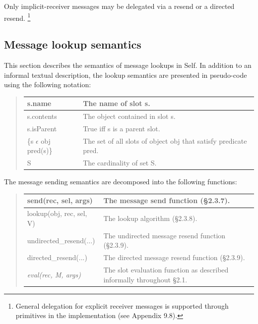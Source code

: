 \documentclass[letterpaper,10pt,english]{sphinxmanual}
\begin{document}
Only implicit-receiver messages may be delegated via a resend or a directed resend. \footnote{
General delegation for explicit receiver messages is supported through primitives in the implementation (see Appendix 9.8).
}


\subsection{Message lookup semantics}
\label{langref:message-lookup-semantics}\label{langref:index-54}
This section describes the semantics of message lookups in Self. In addition to an informal textual description, the lookup semantics are presented in pseudo-code using the following notation:
\begin{quote}

\begin{tabulary}{\linewidth}{|L|L|}
\hline

s.name
 & 
The name of slot s.
\\\hline

s.contents
 & 
The object contained in slot s.
\\\hline

s.isParent
 & 
True iff s is a parent slot.
\\\hline

\{s \(\epsilon\) obj \textbar{} pred(s)\}
 & 
The set of all slots of object obj that satisfy predicate pred.
\\\hline

\textbar{} S \textbar{}
 & 
The cardinality of set S.
\\\hline
\end{tabulary}

\end{quote}

The message sending semantics are decomposed into the following functions:
\begin{quote}

\begin{tabulary}{\linewidth}{|L|L|}
\hline

send(rec, sel, args)
 & 
The message send function (\S{}2.3.7).
\\\hline

lookup(obj, rec, sel, V)
 & 
The lookup algorithm (\S{}2.3.8).
\\\hline

undirected\_resend(...)
 & 
The undirected message resend function (\S{}2.3.9).
\\\hline

directed\_resend(...)
 & 
The directed message resend function (\S{}2.3.9).
\\\hline

\emph{eval(rec, M, args)}
 & 
The slot evaluation function as described informally throughout \S{}2.1.
\\\hline
\end{tabulary}

\end{quote}
\end{document}

